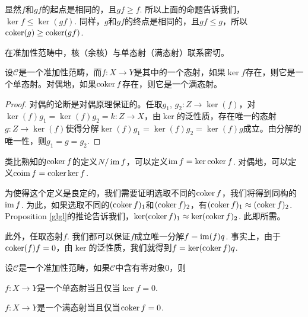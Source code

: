 \begin{para}[复合态射的核与余核]
显然$f$和$gf$的起点是相同的，且$gf\geq f$. 所以上面的命题告诉我们，$\ker f \leq \ker (gf)$. 同样，$g$和$gf$的终点是相同的，且$gf\leq g$，所以$\operatorname{coker}(g) \geq \operatorname{coker}(gf)$.
\end{para}

在准加性范畴中，核（余核）与单态射（满态射）联系密切。

\begin{lem}
设$\mathcal{C}$是一个准加性范畴，而$f:X\to Y$是其中的一个态射，如果$\ker f$存在，则它是一个单态射。对偶地，如果$\operatorname{coker} f$存在，则它是一个满态射。
\end{lem}

\begin{proof}
对偶的论断是对偶原理保证的。任取$g_1$, $g_2:Z\to \ker(f)$，对$\ker (f) g_1=\ker (f) g_2=k:Z\to X$，由$\ker$的泛性质，存在唯一的态射$g:Z\to \ker(f)$使得分解$\ker (f) g_1=\ker (f) g_2=\ker (f) g$成立。由分解的唯一性，则$g_1=g=g_2$.
\end{proof}



\begin{para}
类比熟知的$\operatorname{coker} f$的定义$N/\operatorname{im} f$，可以定义$\operatorname{im} f=\ker \operatorname{coker} f$. 对偶地，可以定义$\operatorname{coim} f=\operatorname{coker} \ker f$.
\end{para}

为使得这个定义是良定的，我们需要证明选取不同的$\operatorname{coker} f$，我们将得到同构的$\operatorname{im} f$. 为此，如果选取不同的$(\operatorname{coker} f)_1$和$(\operatorname{coker} f)_2$，有$(\operatorname{coker} f)_1\approx (\operatorname{coker} f)_2$. Proposition \ref{glgl}的推论告诉我们，$\ker (\operatorname{coker} f)_1\approx \ker (\operatorname{coker} f)_2$. 此即所需。

此外，任取态射$f$. 我们都可以保证$f$成立唯一分解$f=\operatorname{im}(f)q$. 事实上，由于$\operatorname{coker}(f)f=0$，由$\ker$的泛性质，我们就得到$f=\ker(\operatorname{coker} f)q$.

\begin{pro}
设$\mathcal{C}$是一个准加性范畴，如果$\mathcal{C}$中含有零对象$0$，则
\begin{compactenum}[~~~(1)]
\item $f:X\to Y$是一个单态射当且仅当$\ker f=0$.
\item $f:X\to Y$是一个满态射当且仅当$\operatorname{coker} f=0$.
\end{compactenum}
\end{pro}

